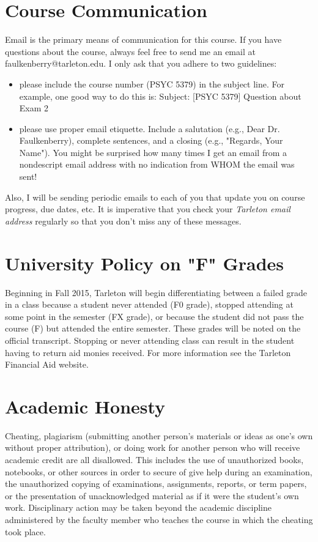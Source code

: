 \documentclass[10pt]{article}
\begin{document}
\section*{Course Communication}
\label{sec:org9fe159a}

Email is the primary means of communication for this course.  If you have questions about the course, always feel free to send me an email at faulkenberry@tarleton.edu.  I only ask that you adhere to two guidelines:
\begin{itemize}
\item please include the course number (PSYC 5379) in the subject line.  For example, one good way to do this is:  Subject: [PSYC 5379] Question about Exam 2
\item please use proper email etiquette.  Include a salutation (e.g., Dear Dr. Faulkenberry), complete sentences, and a closing (e.g., "Regards, Your Name").  You might be surprised how many times I get an email from a nondescript email address with no indication from WHOM the email was sent!
\end{itemize}

Also, I will be sending periodic emails to each of you that update you on course progress, due dates, etc.  It is imperative that you check your \emph{Tarleton email address} regularly so that you don't miss any of these messages.

\section*{University Policy on "F" Grades}
\label{sec:org4b89e63}
Beginning in Fall 2015, Tarleton will begin differentiating between a 
failed grade in a class because a student never attended (F0 grade), 
stopped attending at some point in the semester (FX grade), or because 
the student did not pass the course (F) but attended the entire semester. 
These grades will be noted on the official transcript. Stopping or never 
attending class can result in the student having to return aid monies 
received.  For more information see the Tarleton Financial Aid website.

\section*{Academic Honesty}
\label{sec:org5f8f817}

Cheating, plagiarism (submitting another person’s materials or ideas as one’s own without proper attribution), or doing work for another person who will receive academic credit are all disallowed. This includes the use of unauthorized books, notebooks, or other sources in order to secure of give help during an examination, the unauthorized copying of examinations, assignments, reports, or term papers, or the presentation of unacknowledged material as if it were the student’s own work. Disciplinary action may be taken beyond the academic discipline administered by the faculty member who teaches the course in which the cheating took place.
\end{document}
